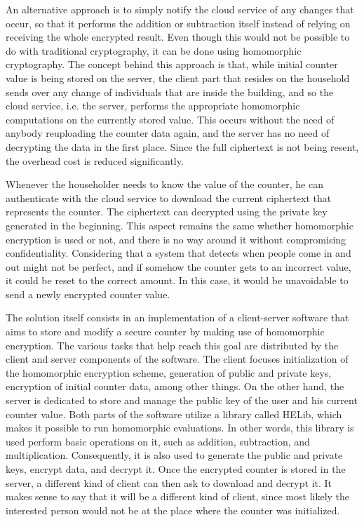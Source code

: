 An alternative approach is to simply notify the cloud service of any changes that occur, so that it performs the addition or subtraction itself instead of relying on receiving the whole encrypted result. Even though this would not be possible to do with traditional cryptography, it can be done using homomorphic cryptography. The concept behind this approach is that, while initial counter value is being stored on the server, the client part that resides on the household sends over any change of individuals that are inside the building, and so the cloud service, i.e. the server, performs the appropriate homomorphic computations on the currently stored value. This occurs without the need of anybody reuploading the counter data again, and the server has no need of decrypting the data in the first place. Since the full ciphertext is not being resent, the overhead cost is reduced significantly.

Whenever the householder needs to know the value of the counter, he can authenticate with the cloud service to download the current ciphertext that represents the counter. The ciphertext can decrypted using the private key generated in the beginning. This aspect remains the same whether homomorphic encryption is used or not, and there is no way around it without compromising confidentiality. Considering that a system that detects when people come in and out might not be perfect, and if somehow the counter gets to an incorrect value, it could be reset to the correct amount. In this case, it would be unavoidable to send a newly encrypted counter value.

The solution itself consists in an implementation of a client-server software that aims to store and modify a secure counter by making use of homomorphic encryption. The various tasks that help reach this goal are distributed by the client and server components of the software. The client focuses initialization of the homomorphic encryption scheme, generation of public and private keys, encryption of initial counter data, among other things. On the other hand, the server is dedicated to store and manage the public key of the user and his current counter value. Both parts of the software utilize a library called HELib, which makes it possible to run homomorphic evaluations. In other words, this library is used perform basic operations on it, such as addition, subtraction, and multiplication. Consequently, it is also used to generate the public and private keys, encrypt data, and decrypt it. Once the encrypted counter is stored in the server, a different kind of client can then ask to download and decrypt it. It makes sense to say that it will be a different kind of client, since most likely the interested person would not be at the place where the counter was initialized.

